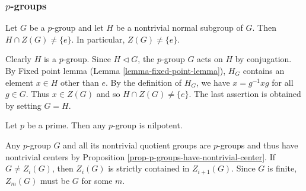 \subsubsection{$p$-groups}
\begin{proposition} \label{prop-p-groups-have-nontrivial-center}
	Let $G$ be a $p$-group and let $H$ be a nontrivial normal subgroup of $G$. Then  $H \cap Z(G) \neq \{e\}$. In particular, $Z(G) \neq \{e\}$.
\end{proposition}
\begin{sketch}
	Clearly $H$ is a $p$-group. Since $H \lhd G$, the $p$-group $G$ acts on  $H$ by conjugation. By Fixed point lemma (Lemma \ref{lemma-fixed-point-lemma}), $H_G$ contains an element $x\in H$ other than $e$. By the definition of $H_G$, we have $x = g^{-1}xg$ for all $g \in G$. Thus $x\in Z(G)$ and so $ H \cap Z(G) \neq \{e\}$. The last assertion is obtained by setting $G=H$.
\end{sketch}
\begin{proposition} \label{prop-p-group-is-nil}
	Let $p$ be a prime. Then any $p$-group is nilpotent.
\end{proposition}
\begin{sketch}
	Any $p$-group $G$ and all its nontrivial quotient groups are $p$-groups and thus have nontrivial centers by Proposition \ref{prop-p-groups-have-nontrivial-center}. If $G \neq Z_i(G)$, then $Z_i(G)$ is strictly contained in $Z_{i+1}(G)$.  Since $G$ is finite, $Z_m( G)$ must be $G$ for some $m$. 
\end{sketch}

